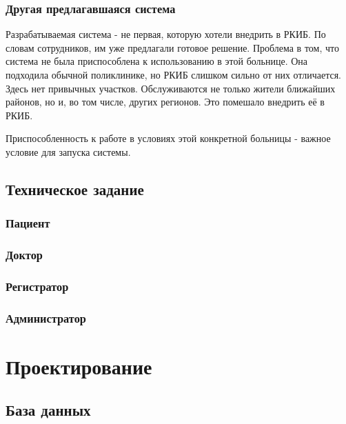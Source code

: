 \documentclass[a4paper,article]{article}
\begin{document}
    \subsubsection{Другая предлагавшаяся система}

        Разрабатываемая система - не первая, которую хотели внедрить в РКИБ. По словам сотрудников, им уже предлагали готовое решение. Проблема в том, что система не была приспособлена к использованию в этой больнице. Она подходила обычной поликлинике, но РКИБ слишком сильно от них отличается. Здесь нет привычных участков. Обслуживаются не только жители ближайших районов, но и, во том числе, других регионов. Это помешало внедрить её в РКИБ.

        Приспособленность к работе в условиях этой конкретной больницы - важное условие для запуска системы.

    \subsection{Техническое задание}

    \subsubsection{Пациент}

    \subsubsection{Доктор}

    \subsubsection{Регистратор}

    \subsubsection{Администратор}

    \pagestyle{plain}

    \newpage

    \section{Проектирование}

    \subsection{База данных}
\end{document}

